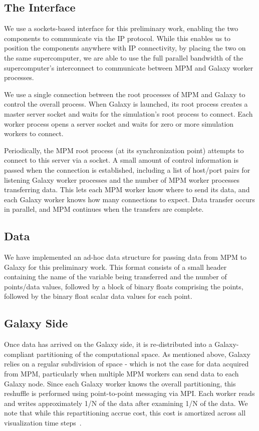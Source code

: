 \documentclass[journal]{IEEEtran}
\begin{document}
\subsection{The Interface}

We use a sockets-based interface for this preliminary work, enabling the two components to communicate via the IP protocol.  While this enables us to position the components anywhere with IP connectivity, by placing the two on the same supercomputer, we are able to use the full parallel bandwidth of the supercomputer's interconnect to communicate between MPM and Galaxy worker processes.

We use a single connection between the root processes of MPM and Galaxy to control the overall process. When Galaxy is launched, its root process creates a master server socket and waits for the simulation's root process to connect. Each worker process opens a server socket and waits for zero or more simulation workers to connect.

Periodically, the MPM root process (at its synchronization point) attempts to connect to this server via a socket. A small amount of control information is passed when the connection is established, including a list of host/port pairs for listening Galaxy worker processes and the number of MPM worker processes transferring data. This lets each MPM worker know where to send its data, and each Galaxy worker knows how many connections to expect. Data transfer occurs in parallel, and MPM continues when the transfers are complete.

\subsection{Data}

We have implemented an ad-hoc data structure for passing data from MPM to Galaxy for this preliminary work.  This format consists of a small header containing the name of the variable being transferred and the number of points/data values, followed by a block of binary floats comprising the points, followed by the binary float scalar data values for each point.

\subsection{Galaxy Side}

Once data has arrived on the Galaxy side, it is re-distributed into a Galaxy-compliant partitioning of the computational space.  As mentioned above, Galaxy relies on a regular subdivision of space - which is not the case for data acquired from MPM, particularly when multiple MPM workers can send data to each Galaxy node.  Since each Galaxy worker knows the overall partitioning, this reshuffle is performed using point-to-point messaging via MPI.  Each worker reads and writes approximately 1/N of the data after examining 1/N of the data.  We note that while this repartitioning accrue cost, this cost is amortized across all visualization time steps~\cite{abram2018galaxy}.
\end{document}
